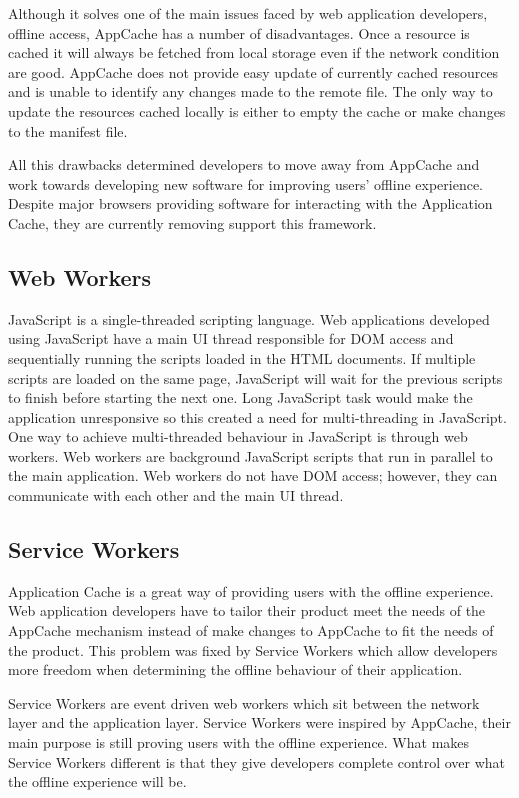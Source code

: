 \documentclass[10pt,a4paper,twoside]{book}
\begin{document}
Although it solves one of the main issues faced by web application developers, offline access, AppCache has a number of disadvantages. Once a resource is cached it will always be fetched from local storage even if the network condition are good. AppCache does not provide easy update of currently cached resources and is unable to identify any changes made to the remote file. The only way to update the resources cached locally is either to empty the cache or make changes to the manifest file.

All this drawbacks determined developers to move away from AppCache and work towards developing new software for improving users' offline experience. Despite major browsers providing software for interacting with the Application Cache, they are currently removing support this framework.

\subsection{Web Workers}
JavaScript is a single-threaded scripting language. Web applications developed using JavaScript have a main UI thread responsible for DOM access and sequentially running the scripts loaded in the HTML documents. If multiple scripts are loaded on the same page, JavaScript will wait for the previous scripts to finish before starting the next one. Long JavaScript task would make the application unresponsive so this created a need for multi-threading in JavaScript. One way to achieve multi-threaded behaviour in JavaScript is through web workers. Web workers are background JavaScript scripts that run in parallel to the main application. Web workers do not have DOM access; however, they can communicate with each other and the main UI thread.

\subsection{Service Workers}
Application Cache is a great way of providing users with the offline experience. Web application developers have to tailor their product meet the needs of the AppCache mechanism instead of make changes to AppCache to fit the needs of the product. This problem was fixed by Service Workers which allow developers more freedom when determining the offline behaviour of their application.

Service Workers are event driven web workers which sit between the network layer and the application layer. Service Workers were inspired by AppCache, their main purpose is still proving users with the offline experience. What makes Service Workers different is that they give developers complete control over what the offline experience will be. 
\end{document}

